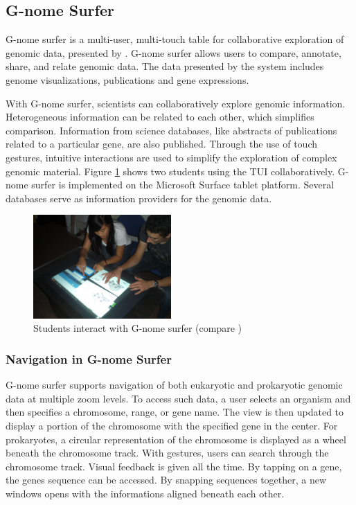 \subsection{G-nome Surfer}
G-nome surfer is a multi-user, multi-touch table for collaborative exploration of genomic data, presented by \cite{shaer10}. G-nome surfer allows users to compare, annotate, share, and relate genomic data. The data presented by the system includes genome visualizations, publications and gene expressions.

With G-nome surfer, scientists can collaboratively explore genomic information. Heterogeneous information can be related to each other, which simplifies comparison. Information from science databases, like abstracts of publications related to a particular gene, are also published. Through the use of touch gestures, intuitive interactions are used to simplify the exploration of complex genomic material. Figure \ref{fig:gnome} shows two students using the TUI collaboratively. G-nome surfer is implemented on the Microsoft Surface tablet platform. Several databases serve as information providers for the genomic data.

\begin{figure}[t]
\centering
\includegraphics[width=0.47\textwidth]{figures/gnome.jpg}
\caption{Students interact with G-nome surfer (compare \protect\cite{shaer10})}
\label{fig:gnome}
\end{figure}

\subsubsection{Navigation in G-nome Surfer}
G-nome surfer supports navigation of both eukaryotic and prokaryotic genomic data at multiple zoom levels. To access such data, a user selects an organism and then specifies a chromosome, range, or gene name. The view is then updated to display a portion of the chromosome with the specified gene in the center. For prokaryotes, a circular representation of the chromosome is displayed as a wheel beneath the chromosome track. With gestures, users can search through the chromosome track. Visual feedback is given all the time. By tapping on a gene, the genes sequence can be accessed. By snapping sequences together, a new windows opens with the informations aligned beneath each other.

